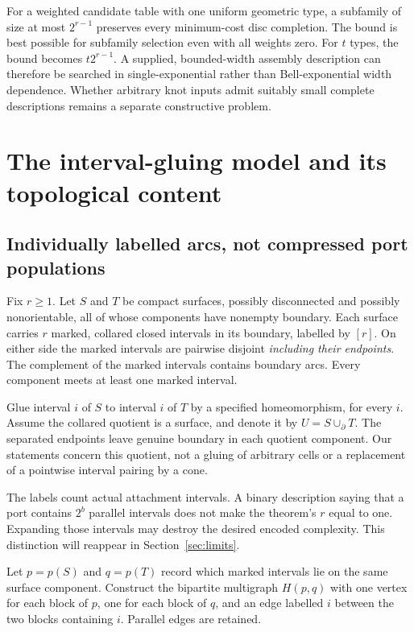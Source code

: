 \documentclass[11pt,a4paper]{article}
\theoremstyle{remark}\newtheorem{remark}[theorem]{Remark}
\begin{document}
For a weighted candidate table with one uniform geometric type, a subfamily of size at most $2^{r-1}$ preserves every minimum-cost disc completion. The bound is best possible for subfamily selection even with all weights zero. For $t$ types, the bound becomes $t2^{r-1}$. A supplied, bounded-width assembly description can therefore be searched in single-exponential rather than Bell-exponential width dependence. Whether arbitrary knot inputs admit suitably small complete descriptions remains a separate constructive problem.

\section{The interval-gluing model and its topological content}\label{sec:topology}
\subsection{Individually labelled arcs, not compressed port populations}
Fix $r\ge1$. Let $S$ and $T$ be compact surfaces, possibly disconnected and possibly nonorientable, all of whose components have nonempty boundary. Each surface carries $r$ marked, collared closed intervals in its boundary, labelled by $[r]$. On either side the marked intervals are pairwise disjoint \emph{including their endpoints}. The complement of the marked intervals contains boundary arcs. Every component meets at least one marked interval.

Glue interval $i$ of $S$ to interval $i$ of $T$ by a specified homeomorphism, for every $i$. Assume the collared quotient is a surface, and denote it by $U=S\cup_\partial T$. The separated endpoints leave genuine boundary in each quotient component. Our statements concern this quotient, not a gluing of arbitrary cells or a replacement of a pointwise interval pairing by a cone.

The labels count actual attachment intervals. A binary description saying that a port contains $2^b$ parallel intervals does not make the theorem's $r$ equal to one. Expanding those intervals may destroy the desired encoded complexity. This distinction will reappear in Section~\ref{sec:limits}.

Let $p=p(S)$ and $q=p(T)$ record which marked intervals lie on the same surface component. Construct the bipartite multigraph $H(p,q)$ with one vertex for each block of $p$, one for each block of $q$, and an edge labelled $i$ between the two blocks containing $i$. Parallel edges are retained.
\end{document}

